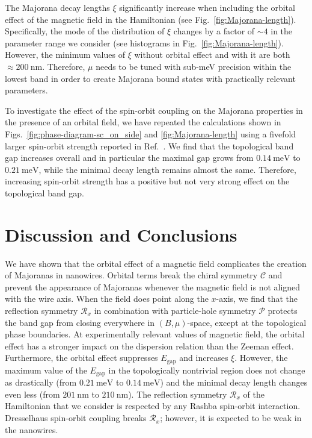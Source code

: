 The Majorana decay lengths $\xi$ significantly increase when including the orbital effect of the magnetic field in the Hamiltonian (see Fig.~\ref{fig:Majorana-length}).
Specifically, the mode of the distribution of $\xi$ changes by a factor of $\sim 4$ in the parameter range we consider (see histograms in Fig.~\ref{fig:Majorana-length}).
However, the minimum values of $\xi$ without orbital effect and with it are both $\approx \SI{200}{\nano\metre}$.
Therefore, $\mu$ needs to be tuned with sub-\unit{meV} precision within the lowest band in order to create Majorana bound states with practically relevant parameters.

To investigate the effect of the spin-orbit coupling on the Majorana properties in the presence of an orbital field, we have repeated the calculations shown in Figs.~\ref{fig:phase-diagram-sc_on_side} and \ref{fig:Majorana-length} using a fivefold larger spin-orbit strength reported in Ref.~\cite{Weperen2015}.
We find that the topological band gap increases overall and in particular the maximal gap grows from $\SI{0.14}{\milli\electronvolt}$ to $\SI{0.21}{\milli\electronvolt}$, while the minimal decay length remains almost the same.
Therefore, increasing spin-orbit strength has a positive but not very strong effect on the topological band gap.

\section{Discussion and Conclusions}

We have shown that the orbital effect of a magnetic field complicates the creation of Majoranas in nanowires.
Orbital terms break the chiral symmetry $\mathcal{C}$ and prevent the appearance of Majoranas whenever the magnetic field is not aligned with the wire axis.
When the field does point along the $x$-axis, we find that the reflection symmetry $\mathcal{R}_x$ in combination with particle-hole symmetry $\mathcal{P}$ protects the band gap from closing everywhere in $(B,\mu)$-space, except at the topological phase boundaries.
At experimentally relevant values of magnetic field, the orbital effect has a stronger impact on the dispersion relation than the Zeeman effect.
Furthermore, the orbital effect suppresses $E_\textrm{gap}$ and increases $\xi$.
However, the maximum value of the $E_\textrm{gap}$ in the topologically nontrivial region does not change as drastically (from $\SI{0.21}{\milli\electronvolt}$ to $\SI{0.14}{\milli\electronvolt}$) and the minimal decay length changes even less (from $\SI{201}{\nano\metre}$ to $\SI{210}{\nano\metre}$).
The reflection symmetry $\mathcal{R}_x$ of the Hamiltonian that we consider is respected by any Rashba spin-orbit interaction.
Dresselhaus spin-orbit coupling breaks $\mathcal{R}_x$; however, it is expected to be weak in the nanowires.

